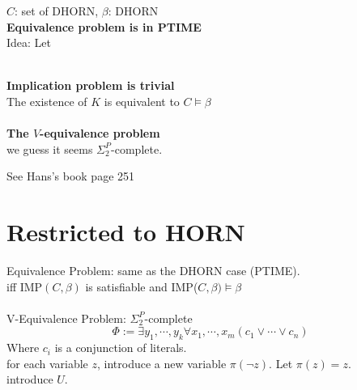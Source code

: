 \documentclass[12pt]{article}
\begin{document}
$C$: set of DHORN, $\beta$: DHORN \\

{\bf Equivalence problem is in PTIME} \\

Idea: Let 




\ \\

{\bf Implication problem is trivial} \\ 

The existence of $K$ is equivalent to $C\models\beta$\\

\ \\


{\bf The $V$-equivalence problem}\\



we guess it seems $\Sigma_2^P$-complete.

See Hans's book page 251


\section{Restricted to HORN}


Equivalence Problem: same as the DHORN case (PTIME).\\

iff IMP$(C,\beta)$ is satisfiable and IMP($C,\beta)\models \beta$\\ 

\ \\

V-Equivalence Problem:  $\Sigma_2^P$-complete\\ 


$$\Phi:=\exists y_1,\cdots, y_k \forall x_1,\cdots, x_m \left(c_1\vee\cdots\vee c_n \right)$$
%
Where $c_i$ is a conjunction of literals.\\

for each variable $z$, introduce a new variable $\pi(\neg z)$. Let $\pi(z)=z$.\\

introduce $U$.\\
\end{document}
